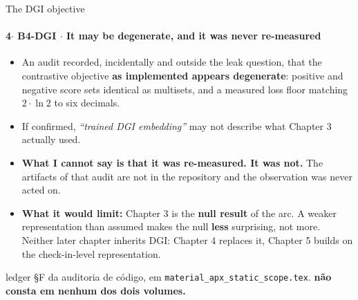 \documentclass{beamer}
\begin{document}
\begin{frame}[noframenumbering]{The DGI objective}
    \framesubtitle{\normalsize 4$\cdot$ \textbf{B4-DGI} $\cdot$ It may be degenerate, and it was never re-measured}
    \hypertarget{b4dgi}{}
    \small
    \begin{itemize}\setlength{\itemsep}{0pt}\setlength{\parskip}{0pt}
        \item An audit recorded, incidentally and outside the leak question, that the contrastive objective \textbf{as implemented appears degenerate}: positive and negative score sets identical as multisets, and a measured loss floor matching $2\cdot\ln 2$ to six decimals.
        \item If confirmed, \textit{``trained DGI embedding''} may not describe what Chapter 3 actually used.
        \item \textcolor{alert}{\textbf{What I cannot say is that it was re-measured. It was not.}} The artifacts of that audit are not in the repository and the observation was never acted on.
        \item \textbf{What it would limit:} Chapter 3 is the \textbf{null result} of the arc. A weaker representation than assumed makes the null \textbf{less} surprising, not more. Neither later chapter inherits DGI: Chapter 4 replaces it, Chapter 5 builds on the check-in-level representation.
    \end{itemize}
    \vfill
    {\scriptsize
    \begin{minipage}[b]{0.775\linewidth}\raggedright\textcolor{black!70}{ledger §F da auditoria de código, em \texttt{material\_apx\_static\_scope.tex}. \textbf{não consta em nenhum dos dois volumes.}}\end{minipage}\hfill
    \begin{minipage}[b]{0.20\linewidth}\raggedleft \hyperlink{b0}{}\end{minipage}}
\end{frame}
\end{document}
